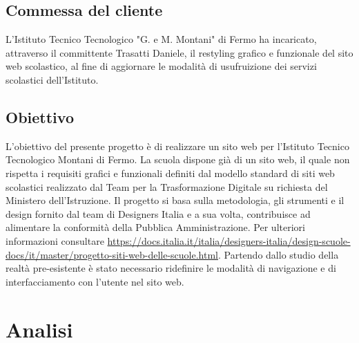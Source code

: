 \documentclass{article}
\begin{document}
	\subsection{\textbf{Commessa del cliente}} 
	\flushleft
	\normalsize
	L'Istituto Tecnico Tecnologico "G. e M. Montani" di Fermo ha incaricato, attraverso il committente Trasatti Daniele, il restyling grafico e funzionale del sito web scolastico, al fine di aggiornare le modalità di usufruizione dei servizi scolastici dell'Istituto.
	 \subsection{\textbf{Obiettivo}} 
	\flushleft
	\normalsize
	L'obiettivo del presente progetto è di realizzare un sito web per l'Istituto Tecnico Tecnologico Montani di Fermo. La scuola dispone già di un sito web, il quale non rispetta i requisiti grafici e funzionali definiti dal modello standard di siti web scolastici realizzato dal Team per la Trasformazione Digitale su richiesta del Ministero dell'Istruzione. Il progetto si basa sulla metodologia, gli strumenti e il design fornito dal team di Designers Italia e a sua volta, contribuisce ad alimentare la conformità della Pubblica Amministrazione. Per ulteriori informazioni consultare \url{https://docs.italia.it/italia/designers-italia/design-scuole-docs/it/master/progetto-siti-web-delle-scuole.html}. Partendo dallo studio della realtà pre-esistente è stato necessario ridefinire le modalità di navigazione e di interfacciamento con l'utente nel sito web.

	\section{\textbf{Analisi}} 
	
\end{document}
